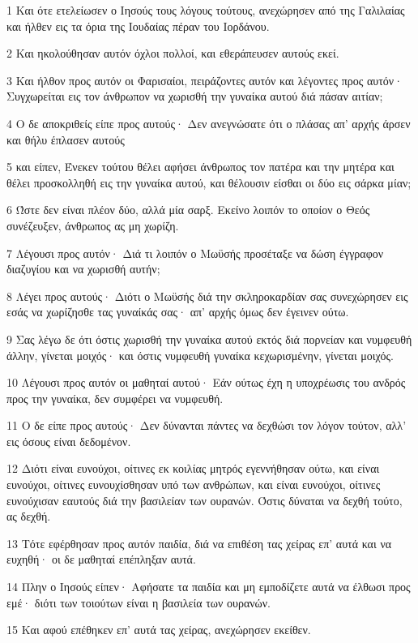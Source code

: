 \par 1 Και ότε ετελείωσεν ο Ιησούς τους λόγους τούτους, ανεχώρησεν από της Γαλιλαίας και ήλθεν εις τα όρια της Ιουδαίας πέραν του Ιορδάνου.
\par 2 Και ηκολούθησαν αυτόν όχλοι πολλοί, και εθεράπευσεν αυτούς εκεί.
\par 3 Και ήλθον προς αυτόν οι Φαρισαίοι, πειράζοντες αυτόν και λέγοντες προς αυτόν· Συγχωρείται εις τον άνθρωπον να χωρισθή την γυναίκα αυτού διά πάσαν αιτίαν;
\par 4 Ο δε αποκριθείς είπε προς αυτούς· Δεν ανεγνώσατε ότι ο πλάσας απ' αρχής άρσεν και θήλυ έπλασεν αυτούς
\par 5 και είπεν, Ένεκεν τούτου θέλει αφήσει άνθρωπος τον πατέρα και την μητέρα και θέλει προσκολληθή εις την γυναίκα αυτού, και θέλουσιν είσθαι οι δύο εις σάρκα μίαν;
\par 6 Ώστε δεν είναι πλέον δύο, αλλά μία σαρξ. Εκείνο λοιπόν το οποίον ο Θεός συνέζευξεν, άνθρωπος ας μη χωρίζη.
\par 7 Λέγουσι προς αυτόν· Διά τι λοιπόν ο Μωϋσής προσέταξε να δώση έγγραφον διαζυγίου και να χωρισθή αυτήν;
\par 8 Λέγει προς αυτούς· Διότι ο Μωϋσής διά την σκληροκαρδίαν σας συνεχώρησεν εις εσάς να χωρίζησθε τας γυναίκάς σας· απ' αρχής όμως δεν έγεινεν ούτω.
\par 9 Σας λέγω δε ότι όστις χωρισθή την γυναίκα αυτού εκτός διά πορνείαν και νυμφευθή άλλην, γίνεται μοιχός· και όστις νυμφευθή γυναίκα κεχωρισμένην, γίνεται μοιχός.
\par 10 Λέγουσι προς αυτόν οι μαθηταί αυτού· Εάν ούτως έχη η υποχρέωσις του ανδρός προς την γυναίκα, δεν συμφέρει να νυμφευθή.
\par 11 Ο δε είπε προς αυτούς· Δεν δύνανται πάντες να δεχθώσι τον λόγον τούτον, αλλ' εις όσους είναι δεδομένον.
\par 12 Διότι είναι ευνούχοι, οίτινες εκ κοιλίας μητρός εγεννήθησαν ούτω, και είναι ευνούχοι, οίτινες ευνουχίσθησαν υπό των ανθρώπων, και είναι ευνούχοι, οίτινες ευνούχισαν εαυτούς διά την βασιλείαν των ουρανών. Όστις δύναται να δεχθή τούτο, ας δεχθή.
\par 13 Τότε εφέρθησαν προς αυτόν παιδία, διά να επιθέση τας χείρας επ' αυτά και να ευχηθή· οι δε μαθηταί επέπληξαν αυτά.
\par 14 Πλην ο Ιησούς είπεν· Αφήσατε τα παιδία και μη εμποδίζετε αυτά να έλθωσι προς εμέ· διότι των τοιούτων είναι η βασιλεία των ουρανών.
\par 15 Και αφού επέθηκεν επ' αυτά τας χείρας, ανεχώρησεν εκείθεν.
